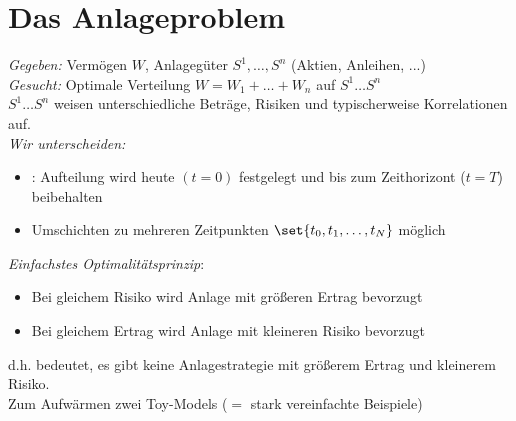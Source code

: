\section{Das Anlageproblem}
\emph{Gegeben:} Vermögen $W$, Anlagegüter $S^1, \dots, S^n$ (Aktien, Anleihen, ...)\\
\emph{Gesucht:} Optimale Verteilung $W = W_1 + \dots + W_n$ auf $S^1 \dots S^n$\\
$S^1 \dots S^n$ weisen unterschiedliche Beträge, Risiken und typischerweise  Korrelationen auf.\\
\emph{Wir unterscheiden:}
\begin{itemize}
	\item {}: Aufteilung wird heute $(t=0)$ festgelegt und bis zum Zeithorizont ($t=T$) beibehalten
	\item {} Umschichten zu mehreren Zeitpunkten $\set{t_0, t_1, \dots, t_N}$ möglich
\end{itemize}
\emph{Einfachstes Optimalitätsprinzip}: 
\begin{itemize}
	\item Bei gleichem Risiko wird Anlage mit größeren Ertrag bevorzugt
	\item Bei gleichem Ertrag wird Anlage mit kleineren Risiko bevorzugt
\end{itemize}
d.h.  bedeutet, es gibt keine Anlagestrategie mit größerem Ertrag und kleinerem Risiko.\\
Zum Aufwärmen zwei Toy-Models ($=$ stark vereinfachte Beispiele)
